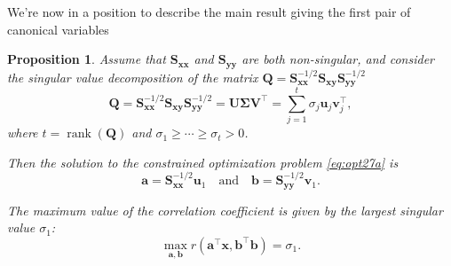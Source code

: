 \documentclass[]{book}
\newtheorem{proposition}{Proposition}[chapter]
\theoremstyle{definition}
\theoremstyle{definition}
\theoremstyle{definition}
\theoremstyle{remark}
\begin{document}
We're now in a position to describe the main result giving the first pair of canonical variables

\begin{proposition}
\protect\hypertarget{prp:unnamed-chunk-4}{}{\label{prp:unnamed-chunk-4} }
Assume that \(\boldsymbol S_{\boldsymbol x\boldsymbol x}\) and \(\boldsymbol S_{\boldsymbol y\boldsymbol y}\) are both non-singular, and consider the singular value decomposition of the matrix \(\boldsymbol Q=\boldsymbol S_{\boldsymbol x\boldsymbol x}^{-1/2} \boldsymbol S_{\boldsymbol x\boldsymbol y}\boldsymbol S_{\boldsymbol y\boldsymbol y}^{-1/2}\)
\begin{equation}
\boldsymbol Q= \boldsymbol S_{\boldsymbol x\boldsymbol x}^{-1/2}\boldsymbol S_{\boldsymbol x\boldsymbol y}\boldsymbol S_{\boldsymbol y\boldsymbol y}^{-1/2} = {\mathbf U}{\pmb \Sigma} {\mathbf V}^\top = \sum_{j=1}^t \sigma_j {\mathbf u}_j {\mathbf v}_j^\top,
\label{eq:svdcca}
\end{equation}
where \(t=\operatorname{rank}(\boldsymbol Q)\) and \(\sigma_1 \geq \cdots \geq \sigma_t >0\).

Then the solution to the constrained optimization problem \eqref{eq:opt27a} is \[\boldsymbol a=\boldsymbol S_{\boldsymbol x\boldsymbol x}^{-1/2}{\mathbf u}_1\quad \mbox{and}\quad \boldsymbol b=\boldsymbol S_{\boldsymbol y\boldsymbol y}^{-1/2}{\mathbf v}_1.\]

The maximum value of the correlation coefficient is given by the largest singular value \(\sigma_1\):
\[\max_{\boldsymbol a, \boldsymbol b} r(\boldsymbol a^\top\boldsymbol x, \boldsymbol b^\top\boldsymbol b)=\sigma_1.\]
\end{proposition}
\end{document}
